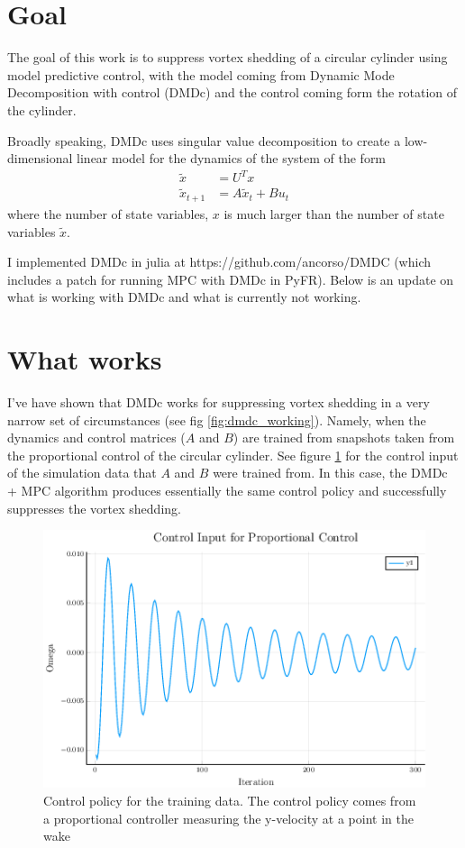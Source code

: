 \documentclass{article}
\begin{document}
\section*{Goal}
The goal of this work is to suppress vortex shedding of a circular cylinder using model predictive control, with the model coming from Dynamic Mode Decomposition with control (DMDc) and the control coming form the rotation of the cylinder.

Broadly speaking, DMDc uses singular value decomposition to create a low-dimensional linear model for the dynamics of the system of the form
\begin{align*}
\tilde{x} &= U^T x \\
\tilde{x}_{t+1} &= A \tilde{x}_t + B u_t
\end{align*}
where the number of state variables, $x$ is much larger than the number of state variables $\tilde{x}$.

I implemented DMDc in julia at https://github.com/ancorso/DMDC (which includes a patch for running MPC with DMDc in PyFR). Below is an update on what is working with DMDc and what is currently not working.

\section*{What works}
I've have shown that DMDc works for suppressing vortex shedding in a very narrow set of circumstances (see fig \ref{fig:dmdc_working}). Namely, when the dynamics and control matrices ($A$ and $B$) are trained from snapshots taken from the proportional control of the circular cylinder. See figure \ref{fig:training_data} for the control input of the simulation data that $A$ and $B$ were trained from. In this case, the DMDc + MPC algorithm produces essentially the same control policy and successfully suppresses the vortex shedding.


\begin{figure}[ht]
  \centering
  \includegraphics[scale=0.5]{../images/training_data.png}
  \caption{Control policy for the training data. The control policy comes from a proportional controller measuring the y-velocity at a point in the wake}
  \label{fig:training_data}
\end{figure}
\end{document}
